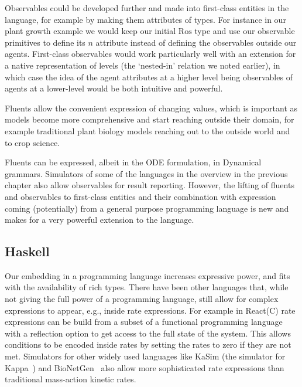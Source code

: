 Observables could be developed further and made into first-class entities in
the language, for example by making them attributes of types. For instance in
our plant growth example we would keep our initial $\mathrm{Ros}$ type and use
our observable primitives to define its $n$ attribute instead of defining the
observables outside our agents. First-class observables would work particularly
well with an extension for a native representation of levels (the `nested-in'
relation we noted earlier), in which case the idea of the agent attributes at a
higher level being observables of agents at a lower-level would be both
intuitive and powerful.

Fluents allow the convenient expression of changing values, which is
important as models become more comprehensive and start reaching outside their
domain, for example traditional plant biology models reaching out to the outside
world and to crop science.

Fluents can be expressed, albeit in the ODE formulation, in Dynamical
grammars. Simulators of some of the languages in the overview in the previous
chapter also allow observables for result reporting. However, the lifting of
fluents and observables to first-class entities and their combination with
expression coming (potentially) from a general purpose programming language is
new and makes for a very powerful extension to the language.


\subsection{Haskell}
Our embedding in a programming language increases expressive power, and fits
with the availability of rich types.  There have been other languages that,
while not giving the full power of a programming language, still allow for
complex expressions to appear, e.g., inside rate expressions. For example in
React(C) \citep{john_biochemical_2011} rate expressions can be build from a subset
of a functional programming language with a reflection option to get access to
the full state of the system. This allows conditions to be encoded inside rates
by setting the rates to zero if they are not met. Simulators for other widely
used languages like KaSim (the simulator for Kappa~\citep{danos2008}) and
BioNetGen~\citep{blinov_bionetgen:_2004} also allow more sophisticated rate
expressions than traditional mass-action kinetic rates.

